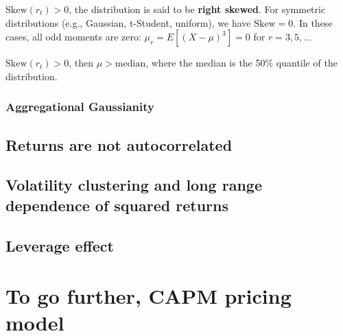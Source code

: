 \documentclass{article}
\begin{document}
\( \text{Skew}(r_t) > 0 \), the distribution is said to be \textbf{right skewed}. For symmetric distributions (e.g., Gaussian, t-Student, uniform), 
we have \( \text{Skew} = 0 \). In these cases, all odd moments are zero:
\( \mu_r = E[(X - \mu)^3] = 0 \) for \( r = 3, 5, \dots \)

\( \text{Skew}(r_t) > 0 \), then \( \mu > \text{median} \), where the median is the 50\% quantile of the distribution.

\subsubsection{Aggregational Gaussianity}

\subsection{Returns are not autocorrelated}

\subsection{Volatility clustering and long range dependence of squared returns}

\subsection{Leverage effect}


\appendix



\section{To go further, CAPM pricing model}


\end{document}
